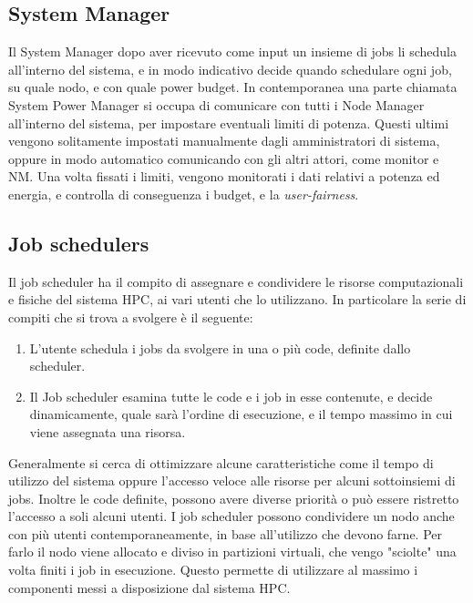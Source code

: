 \subsection{System Manager}
Il System Manager dopo aver ricevuto come input un insieme di jobs li schedula all'interno del sistema, e in modo indicativo decide quando schedulare ogni job, su quale nodo, e con quale power budget. In contemporanea una parte chiamata System Power Manager %
si occupa di comunicare con tutti i Node Manager all'interno del sistema, per impostare eventuali limiti di potenza. Questi ultimi vengono solitamente impostati manualmente dagli amministratori di sistema, oppure in modo automatico comunicando con gli altri attori, come monitor e NM. Una volta fissati i limiti, vengono monitorati i dati relativi a potenza ed energia, e controlla di conseguenza i budget, e la \emph{user-fairness}.
\subsection{Job schedulers}
Il job scheduler ha il compito di assegnare e condividere le risorse computazionali e fisiche del sistema HPC, ai vari utenti che lo utilizzano. In particolare la serie di compiti che si trova a svolgere è il seguente:
\begin{enumerate}
    \item L'utente schedula i jobs da svolgere in una o più code, definite dallo scheduler.
    \item Il Job scheduler esamina tutte le code e i job in esse contenute, e decide dinamicamente, quale sarà l'ordine di esecuzione, e il tempo massimo in cui viene assegnata una risorsa.
\end{enumerate}
Generalmente si cerca di ottimizzare alcune caratteristiche come il tempo di utilizzo del sistema oppure l'accesso veloce alle risorse per alcuni sottoinsiemi di jobs. Inoltre le code definite, possono avere diverse priorità o può essere ristretto l'accesso a soli alcuni utenti. I job scheduler possono condividere un nodo anche con più utenti contemporaneamente, in base all'utilizzo che devono farne. Per farlo il nodo viene allocato e diviso in partizioni virtuali, che vengo "sciolte" una volta finiti i job in esecuzione. Questo permette di utilizzare al massimo i componenti messi a disposizione dal sistema HPC.

